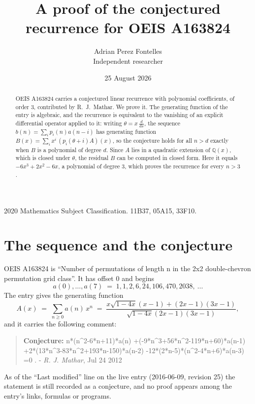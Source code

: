 \documentclass[11pt,a4paper]{article}
\title{A proof of the conjectured recurrence for OEIS A163824}
\author{Adrian Perez Fontelles\\ \small Independent researcher}
\date{25 August 2026}
\theoremstyle{plain}
\theoremstyle{definition}
\begin{document}
\maketitle

\begin{abstract}
OEIS A163824 carries a conjectured linear recurrence with polynomial coefficients, of
order 3, contributed by R.~J.~Mathar. We prove it. The generating function of the
entry is algebraic, and the recurrence is equivalent to the vanishing of an explicit
differential operator applied to it: writing $\theta=x\,\frac{d}{dx}$, the sequence
$b(n)=\sum_{i}p_{i}(n)a(n-i)$ has generating function
$B(x)=\sum_{i}x^{i}\,(p_{i}(\theta+i)A)(x)$, so the conjecture holds for all $n>d$ exactly
when $B$ is a polynomial of degree $d$. Since $A$ lies in a quadratic extension of
$\mathbb{Q}(x)$, which is closed under $\theta$, the residual $B$ can be computed in
closed form. Here it equals $- 6 x^{3} + 2 x^{2} - 6 x$, a polynomial of degree $3$, which proves
the recurrence for every $n>3$.
\end{abstract}

\noindent\small 2020 Mathematics Subject Classification. 11B37, 05A15, 33F10.\normalsize

\section{The sequence and the conjecture}

OEIS A163824 is ``Number of permutations of length n in the 2x2 double-chevron permutation grid class''. It has offset $0$ and begins
\[
a(0),\dots,a(7)\;=\;1, 1, 2, 6, 24, 106, 470, 2038,\ \dots
\]
The entry gives the generating function
\begin{equation}\label{eq:gf}
A(x)\;=\;\sum_{n\ge 0} a(n)\,x^{n}\;=\;\frac{x \sqrt{1 - 4 x} \left(x - 1\right) + \left(2 x - 1\right) \left(3 x - 1\right)}{\sqrt{1 - 4 x} \left(2 x - 1\right) \left(3 x - 1\right)} ,
\end{equation}
and it carries the following comment:
\begin{quote}\small
\textbf{Conjecture:} n*(n\^{}2-6*n+11)*a(n) +(-9*n\^{}3+56*n\^{}2-119*n+60)*a(n-1) +2*(13*n\^{}3-83*n\^{}2+193*n-150)*a(n-2) -12*(2*n-5)*(n\^{}2-4*n+6)*a(n-3) =0 . - \emph{R. J. Mathar}, Jul 24 2012
\end{quote}
As of the ``Last modified'' line on the live entry (2016-06-09, revision 25) the
statement is still recorded as a conjecture, and no proof appears among the entry's links,
formulas or programs.
\end{document}
